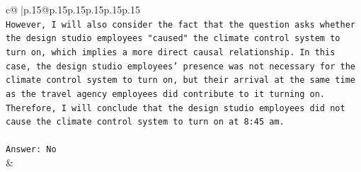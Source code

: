 \documentclass{article}
\begin{document}
{\begin{supertabular}{c@{$\;$}|p{.15\linewidth}@{}p{.15\linewidth}p{.15\linewidth}p{.15\linewidth}p{.15\linewidth}p{.15\linewidth}}
{{{\\ 
\texttt{However, I will also consider the fact that the question asks whether the design studio employees "caused" the climate control system to turn on, which implies a more direct causal relationship. In this case, the design studio employees' presence was not necessary for the climate control system to turn on, but their arrival at the same time as the travel agency employees did contribute to it turning on. Therefore, I will conclude that the design studio employees did not cause the climate control system to turn on at 8:45 am.} \\
\\ 
\texttt{Answer: No} \\
            }
        }
    }
    & \\ \\

\end{supertabular}
}
\end{document}
